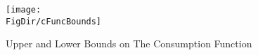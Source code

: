 \hypertarget{cFuncBounds}{}
\begin{figure}
\centering
\texttt{[image: \\FigDir/cFuncBounds]}
\caption{Upper and Lower Bounds on The Consumption Function}
\label{fig:cFuncBounds}
\end{figure}
